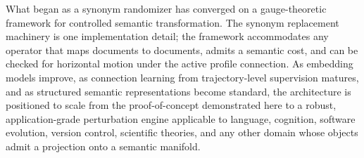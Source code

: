 \documentclass[12pt, a4paper]{article}
\theoremstyle{plain}
\theoremstyle{definition}
\theoremstyle{remark}
\begin{document}
What began as a synonym randomizer has converged on a gauge-theoretic framework
for controlled semantic transformation.  The synonym replacement machinery is
one implementation detail; the framework accommodates any operator that maps
documents to documents, admits a semantic cost, and can be checked for horizontal
motion under the active profile connection.  As embedding models improve, as
connection learning from trajectory-level supervision matures, and as structured
semantic representations become standard, the architecture is positioned to
scale from the proof-of-concept demonstrated here to a robust, application-grade
perturbation engine applicable to language, cognition, software evolution,
version control, scientific theories, and any other domain whose objects admit
a projection onto a semantic manifold.

\newpage

\end{document}
